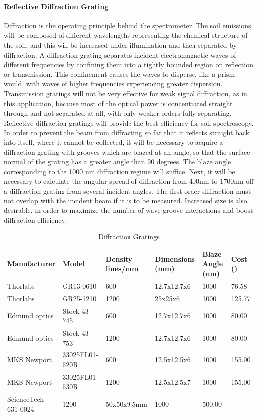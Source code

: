 \paragraph{Reflective Diffraction Grating}

Diffraction is the operating principle behind the spectrometer. The soil emissions will be composed of different wavelengths representing the chemical structure of the soil, and this will be increased under illumination and then separated by diffraction. A diffraction grating separates incident electromagnetic waves of different frequencies by confining them into a tightly bounded region on reflection or transmission. This confinement causes the waves to disperse, like a prism would, with waves of higher frequencies experiencing greater dispersion. Transmission gratings will not be very effective for weak signal diffraction, as in this application, because most of the optical power is concentrated straight through and not separated at all, with only weaker orders fully separating. Reflective diffraction gratings will provide the best efficiency for soil spectroscopy. In order to prevent the beam from diffracting so far that it reflects straight back into itself, where it cannot be collected, it will be necessary to acquire a diffraction grating with grooves which are blazed at an angle, so that the surface normal of the grating has a greater angle than 90 degrees. The blaze angle corresponding to the 1000 nm diffraction regime will suffice. Next, it will be necessary to calculate the angular spread of diffraction from 400nm to 1700nm off a diffraction grating from several incident angles. The first order diffraction must not overlap with the incident beam if it is to be measured. Increased size is also desirable, in order to maximize the number of wave-groove interactions and boost diffraction efficiency. 

\begin{table}[H]
	\centering
	\label{table:DiffractionGratings}
	\caption{Diffraction Gratings}
	\begin{tabular}{|l|l|l|l|l|l|}
	\hline
	Manufacturer & Model & Density lines/mm & Dimensions (mm) & Blaze Angle (nm) & Cost (\textdollar)\\
	\hline
	Thorlabs & GR13-0610 & 600 & 12.7x12.7x6 & 1000 & 76.58\\
	\hline
	Thorlabs & GR25-1210 & 1200 & 25x25x6 & 1000 & 125.77\\
	\hline
	Edmund optics & Stock 43-745 & 600 & 12.7x12.7x6 & 1000 & 80.00\\
	\hline
	Edmund optics & Stock 43-753 & 1200 & 12.7x12.7x6 & 1000 & 80.00\\
	\hline
	MKS Newport & 33025FL01-520R & 600 & 12.5x12.5x6 & 1000 & 155.00\\
	\hline
	MKS Newport & 33025FL01-530R & 1200 & 12.5x12.5x7 & 1000 & 155.00\\
	\hline
	ScienceTech	631-0024 & 1200 & 50x50x9.5mm & 1000 & 500.00\\
	\hline
	\end{tabular}
\end{table}

